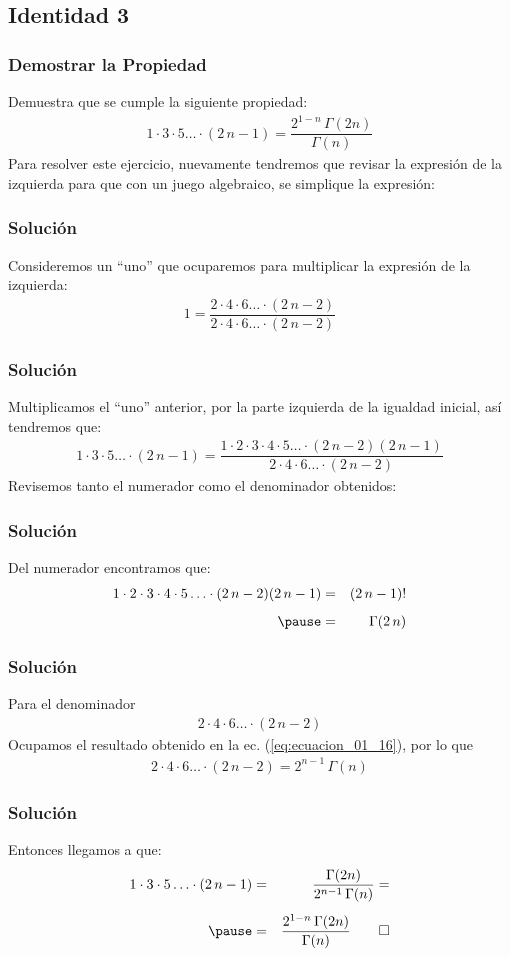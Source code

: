 \documentclass[12pt]{beamer}
\begin{document}
\subsection{Identidad 3}
\begin{frame}
\frametitle{Demostrar la Propiedad}
Demuestra que se cumple la siguiente propiedad:
\begin{align*}
1 \cdot 3 \cdot 5 \ldots \cdot (2 \, n - 1) = \dfrac{2^{1-n} \, \Gamma (2 n)}{\Gamma (n)}
\end{align*}
\pause
Para resolver este ejercicio, nuevamente tendremos que revisar la expresión de la izquierda para que con un juego algebraico, se simplique la expresión:
\end{frame}
\begin{frame}
\frametitle{Solución}
Consideremos un \enquote{uno} que ocuparemos para multiplicar la expresión de la izquierda:
\begin{align*}
1 = \dfrac{ 2 \cdot 4 \cdot 6 \ldots \cdot (2 \, n - 2)}{ 2 \cdot 4 \cdot 6 \ldots \cdot (2 \, n - 2)}
\end{align*}
\end{frame}
\begin{frame}
\frametitle{Solución}
Multiplicamos el \enquote{uno} anterior, por la parte izquierda de la igualdad inicial, así tendremos que:
{\fontsize{12}{12}\selectfont
\begin{align*}
1 \cdot 3 \cdot 5 \ldots \cdot (2 \, n - 1) = \dfrac{1 \cdot 2 \cdot 3 \cdot 4 \cdot 5 \ldots \cdot (2 \, n - 2)(2 \, n -1)}{2 \cdot 4 \cdot 6 \ldots \cdot (2 \, n - 2)}
\end{align*}}
\pause
Revisemos tanto el numerador como el denominador obtenidos:
\end{frame}
\begin{frame}
\frametitle{Solución}
Del numerador encontramos que:
\begin{eqnarray*}
1 \cdot 2 \cdot 3 \cdot 4 \cdot 5 \ldots \cdot (2 \, n - 2)(2 \, n -1) &=& (2 \, n - 1)! \\[0.5em] \pause
&=& \Gamma (2 \, n)
\end{eqnarray*}
\end{frame}
\begin{frame}
\frametitle{Solución}
Para el denominador
\begin{align*}
2 \cdot 4 \cdot 6 \ldots \cdot (2 \, n - 2)
\end{align*}
\pause
Ocupamos el resultado obtenido en la ec. (\ref{eq:ecuacion_01_16}), por lo que
\begin{align*}
2 \cdot 4 \cdot 6 \ldots \cdot (2 \, n - 2) = 2^{n-1} \, \Gamma (n)
\end{align*}
\end{frame}
\begin{frame}
\frametitle{Solución}
Entonces llegamos a que:
\begin{eqnarray*}
1 \cdot 3 \cdot 5 \ldots \cdot (2 \, n - 1) &=& \dfrac{\Gamma (2 n)}{2^{n-1} \, \Gamma (n)} = \\[0.5em] \pause
&=& \dfrac{2^{1-n} \, \Gamma(2n)}{\Gamma (n)} \qed
\end{eqnarray*}
\end{frame}
\end{document}
